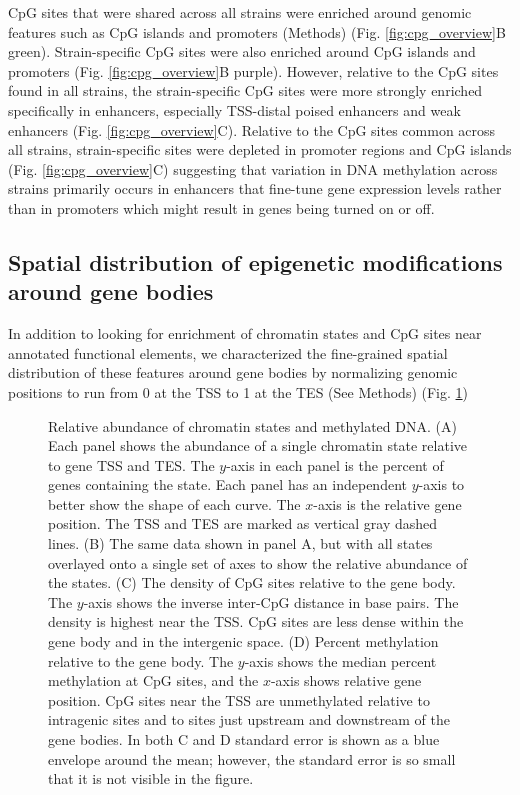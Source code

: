 \documentclass[
  11pt,
]{article}
\begin{document}
CpG sites that were shared across all strains were enriched around
genomic features such as CpG islands and promoters (Methods) (Fig.
\ref{fig:cpg_overview}B green). Strain-specific CpG sites were also
enriched around CpG islands and promoters (Fig. \ref{fig:cpg_overview}B
purple). However, relative to the CpG sites found in all strains, the
strain-specific CpG sites were more strongly enriched specifically in
enhancers, especially TSS-distal poised enhancers and weak enhancers
(Fig. \ref{fig:cpg_overview}C). Relative to the CpG sites common across
all strains, strain-specific sites were depleted in promoter regions and
CpG islands (Fig. \ref{fig:cpg_overview}C) suggesting that variation in
DNA methylation across strains primarily occurs in enhancers that
fine-tune gene expression levels rather than in promoters which might
result in genes being turned on or off.

\hypertarget{spatial-distribution-of-epigenetic-modifications-around-gene-bodies}{%
\subsection{Spatial distribution of epigenetic modifications around gene
bodies}\label{spatial-distribution-of-epigenetic-modifications-around-gene-bodies}}

In addition to looking for enrichment of chromatin states and CpG sites
near annotated functional elements, we characterized the fine-grained
spatial distribution of these features around gene bodies by normalizing
genomic positions to run from 0 at the TSS to 1 at the TES (See Methods)
(Fig. \ref{fig:state_abundance})

\begin{figure}[ht!]
\caption{Relative abundance of chromatin states and methylated DNA. (A) Each panel 
shows the abundance of a single chromatin state relative to gene TSS and TES. The 
$y$-axis in each panel is the percent of genes containing the state. Each
panel has an independent $y$-axis to better show the shape of each curve.
The $x$-axis is the relative gene position. The TSS and TES are marked as vertical
gray dashed lines. (B) The same data shown in panel A, but with all states overlayed
onto a single set of axes to show the relative abundance of the states. 
(C) The density of CpG sites relative to the gene body. The $y$-axis shows 
the inverse inter-CpG distance in base pairs. The density is highest near the 
TSS. CpG sites are less dense within the gene body and in the intergenic space. 
(D) Percent methylation relative to the gene body. The $y$-axis shows the median 
percent methylation at CpG sites, and the $x$-axis shows relative gene position. 
CpG sites near the TSS are unmethylated relative to intragenic sites and to sites
just upstream and downstream of the gene bodies. In both C and D standard error 
is shown as a blue envelope around the mean; however, the standard error is so 
small that it is not visible in the figure.}
\label{fig:state_abundance}
\end{figure}
\end{document}
